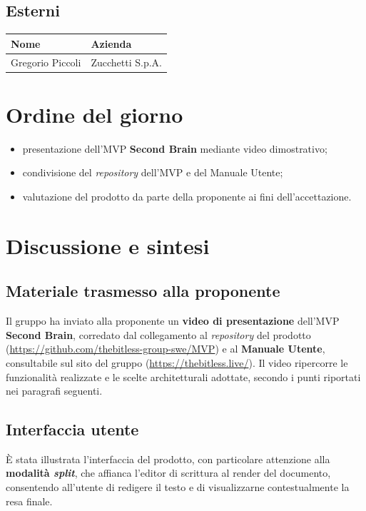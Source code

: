 \documentclass[a4paper, 10pt, colorlinks=true, linkcolor=black, urlcolor=blue, citecolor=blue, hidelinks]{article}
\begin{document}
\subsection{Esterni}
\begin{center}
\begin{tabular}{|l|l|}
\hline
\textbf{Nome} & \textbf{Azienda} \\
\hline
Gregorio Piccoli & Zucchetti S.p.A. \\
\hline
\end{tabular}
\end{center}

\section{Ordine del giorno}

\begin{itemize}
    \item presentazione dell'MVP \textbf{Second Brain} mediante video dimostrativo;
    \item condivisione del \textit{repository} dell'MVP e del Manuale Utente;
    \item valutazione del prodotto da parte della proponente ai fini dell'accettazione.
\end{itemize}

\section{Discussione e sintesi}

\subsection{Materiale trasmesso alla proponente}

Il gruppo ha inviato alla proponente un \textbf{video di presentazione} dell'MVP \textbf{Second Brain}, corredato dal collegamento al \textit{repository} del prodotto (\url{https://github.com/thebitless-group-swe/MVP}) e al \textbf{Manuale Utente}, consultabile sul sito del gruppo (\url{https://thebitless.live/}). Il video ripercorre le funzionalità realizzate e le scelte architetturali adottate, secondo i punti riportati nei paragrafi seguenti.

\subsection{Interfaccia utente}

È stata illustrata l'interfaccia del prodotto, con particolare attenzione alla \textbf{modalità \textit{split}}, che affianca l'editor di scrittura al render del documento, consentendo all'utente di redigere il testo e di visualizzarne contestualmente la resa finale.
\end{document}
